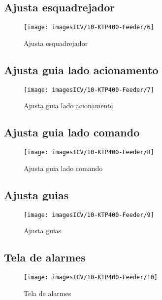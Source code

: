 \thispagestyle{fancy}
\vspace{\fill}
\subsection{\small Ajusta esquadrejador}
\begin{figure}
    \centering
    \texttt{[image: imagesICV/10-KTP400-Feeder/6]}
    \caption{Ajusta esquadrejador}
\end{figure}
\newpage

\thispagestyle{fancy}
\vspace{\fill}
\subsection{\small Ajusta guia lado acionamento}
\begin{figure}
    \centering
    \texttt{[image: imagesICV/10-KTP400-Feeder/7]}
    \caption{Ajusta guia lado acionamento}
\end{figure}
\newpage

\thispagestyle{fancy}
\vspace{\fill}
\subsection{\small Ajusta guia lado comando}
\begin{figure}
    \centering
    \texttt{[image: imagesICV/10-KTP400-Feeder/8]}
    \caption{Ajusta guia lado comando}
\end{figure}
\newpage

\thispagestyle{fancy}
\vspace{\fill}
\subsection{\small Ajusta guias}
\begin{figure}
    \centering
    \texttt{[image: imagesICV/10-KTP400-Feeder/9]}
    \caption{Ajusta guias}
\end{figure}
\newpage

\thispagestyle{fancy}
\vspace{\fill}
\subsection{\small Tela de alarmes}
\begin{figure}
    \centering
    \texttt{[image: imagesICV/10-KTP400-Feeder/10]}
    \caption{Tela de alarmes}
\end{figure}
